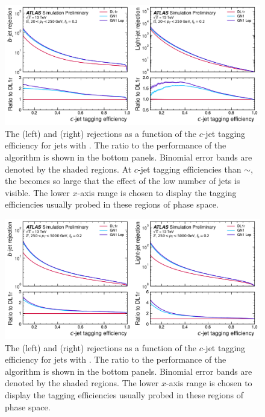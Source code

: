 \begin{figure}[!p]
    \centering
    \includegraphics[width=\textwidth]{chapters/gnn_tagger/figs/results/main/ttbar/ttbar_roc_ctag.pdf}
    \caption{
        The \bjet (left) and \ljet (right) rejections as a function of the $c$-jet tagging efficiency for \ttbar jets with \ttbarpt.
        The ratio to the performance of the \DLr algorithm is shown in the bottom panels.
        Binomial error bands are denoted by the shaded regions.
        At $c$-jet tagging efficiencies than $\sim$, the \lrej becomes so large that the effect of the low number of jets is visible.
        The lower $x$-axis range is chosen to display the \cjet tagging efficiencies usually probed in these regions of phase space.
    }
    \label{fig:ttbar_ctag_roc}
\end{figure}

\begin{figure}[!p]
   \centering
   \includegraphics[width=\textwidth]{chapters/gnn_tagger/figs/results/main/zprime/zprime_roc_ctag.pdf}
   \caption{
        The \bjet (left) and \ljet (right) rejections as a function of the $c$-jet tagging efficiency for \Zprime jets with \Zprimept.
        The ratio to the performance of the \DLr algorithm is shown in the bottom panels.
        Binomial error bands are denoted by the shaded regions.
        The lower $x$-axis range is chosen to display the \cjet tagging efficiencies usually probed in these regions of phase space.
    }
   \label{fig:zprime_ctag_roc}
\end{figure}



